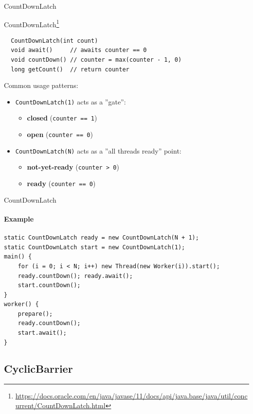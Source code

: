 \begin{frame}[fragile]{CountDownLatch}

CountDownLatch\footnote{\tiny\url{https://docs.oracle.com/en/java/javase/11/docs/api/java.base/java/util/concurrent/CountDownLatch.html}}

\begin{verbatim}
  CountDownLatch(int count)
  void await()     // awaits counter == 0
  void countDown() // counter = max(counter - 1, 0)
  long getCount()  // return counter
\end{verbatim}

Common usage patterns:
\begin{itemize}
    \item \texttt{CountDownLatch(1)} acts as a ''gate'':
    \begin{itemize}
      \item \textbf{closed} (\texttt{counter == 1}) 
      \item \textbf{open} (\texttt{counter == 0})
     \end{itemize}

    \item \texttt{CountDownLatch(N)} acts as a ''all threads ready'' point:
    \begin{itemize}
      \item \textbf{not-yet-ready} (\texttt{counter > 0})
      \item \textbf{ready} (\texttt{counter == 0})
     \end{itemize}
\end{itemize}

\end{frame}


\begin{frame}[fragile]{CountDownLatch}
\framesubtitle{Example}

\begin{verbatim}
static CountDownLatch ready = new CountDownLatch(N + 1);
static CountDownLatch start = new CountDownLatch(1);
main() {
    for (i = 0; i < N; i++) new Thread(new Worker(i)).start();
    ready.countDown(); ready.await();
    start.countDown();
}
worker() {
    prepare();
    ready.countDown();
    start.await();
}
\end{verbatim}
\end{frame}


\subsection{CyclicBarrier}
\showTOCSub

